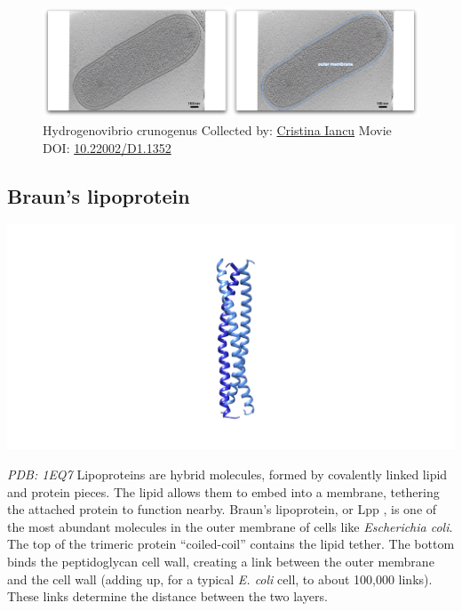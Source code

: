 \documentclass[]{tufte-book}
\begin{document}
\begin{figure}
\includegraphics{movie_stills/2_3} \caption[Hydrogenovibrio crunogenus Collected by:
\protect\hyperlink{cristina_iancu}{Cristina Iancu} Movie DOI:
\href{https://doi.org/10.22002/D1.1352}{10.22002/D1.1352}]{Hydrogenovibrio crunogenus Collected by:
\protect\hyperlink{cristina_iancu}{Cristina Iancu} Movie DOI:
\href{https://doi.org/10.22002/D1.1352}{10.22002/D1.1352}}\label{fig:2-3}
\end{figure}

\subsection{Braun's lipoprotein}\label{Brauns_lipoprotein}

\includegraphics{img/schematics/2_3_1}

\emph{PDB: 1EQ7} Lipoproteins are hybrid molecules, formed by covalently
linked lipid and protein pieces. The lipid allows them to embed into a
membrane, tethering the attached protein to function nearby. Braun's
lipoprotein, or Lpp \citep{shu2000}, is one of the most abundant
molecules in the outer membrane of cells like \emph{Escherichia coli}.
The top of the trimeric protein ``coiled-coil'' contains the lipid
tether. The bottom binds the peptidoglycan cell wall, creating a link
between the outer membrane and the cell wall (adding up, for a typical
\emph{E. coli} cell, to about 100,000 links). These links determine the
distance between the two layers.
\end{document}
